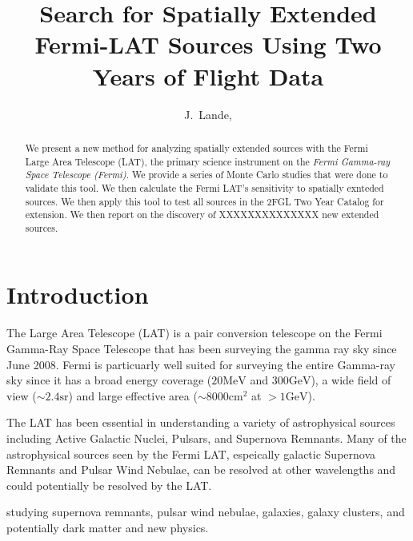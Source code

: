 \documentclass[preprint]{aastex}
\newcommand{\mev}{\text{MeV}\xspace}
\newcommand{\gev}{\text{GeV}\xspace}
\newcommand{\sr}{\text{sr}\xspace}
\newcommand{\cm}{\text{cm}\xspace}
\begin{document}
\title{Search for Spatially Extended Fermi-LAT Sources Using Two Years of Flight
Data}

\author{
J.~Lande, 
}


\begin{abstract}
We present a new method for analyzing spatially extended sources with
the Fermi Large Area Telescope (LAT), the primary science instrument
on the {\em Fermi Gamma-ray Space Telescope (Fermi)}.  We provide a
series of Monte Carlo studies that were done to validate this tool.
We then calculate the Fermi LAT's sensitivity to spatially exnteded
sources.
We then apply this tool to test all sources in the 2FGL Two Year Catalog
for extension.\cite{2FGL} We then report on the discovery of XXXXXXXXXXXXXX new
extended sources.
\end{abstract}

\section{Introduction}


The Large Area Telescope (LAT) is a pair conversion telescope on the
Fermi Gamma-Ray Space Telescope that has been surveying the gamma ray
sky since June 2008.  Fermi is particuarly well suited for surveying
the entire Gamma-ray sky since it has a broad energy coverage ($20\mev$
and $300\gev$), a wide field of view ($\sim 2.4 \sr$) and large effective area
($\sim 8000 \cm^2$ at $>1\gev$).

The LAT has been essential in understanding a variety of astrophysical
sources including Active Galactic Nuclei, Pulsars, and Supernova Remnants.
Many of the astrophysical sources seen by the Fermi LAT, espeically
galactic Supernova Remnants and Pulsar Wind Nebulae, can be resolved at
other wavelengths and could potentially be resolved by the LAT.

studying supernova remnants, 
pulsar wind nebulae, 
galaxies,  galaxy clusters, and potentially dark matter and new physics.
\end{document}

